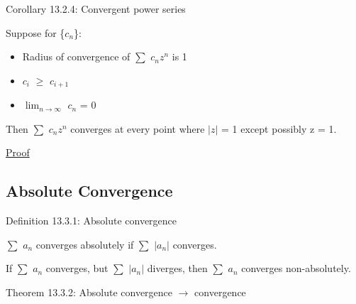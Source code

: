 { \color{orange} Corollary 13.2.4: Convergent power series }

    \begin{adjustbox}{minipage=14cm, right, vspace=0.1cm 0cm}
        Suppose for \{$c_n$\}:

        \begin{itemize}[leftmargin=1cm, itemsep=0.1cm]
            \item Radius of convergence of $\sum$ $c_n z^n$ is 1
            
            \item $c_i$ $\geq$ $c_{i+1}$
            
            \item $\lim_{n \rightarrow \infty}$ $c_n$ = 0
        \end{itemize}

        Then $\sum$ $c_n z^n$ converges at every point where $|z|$ = 1
        except possibly z = 1.
    \end{adjustbox}

{ \color{magenta} \underline{Proof} }






\subsection{ Absolute Convergence }

{ \color{blue} Definition 13.3.1: Absolute convergence }

    \begin{adjustbox}{minipage=14cm, right, vspace=0.1cm 0cm}
        $\sum$ $a_n$ converges absolutely if $\sum$ $|a_n|$ converges.

        If $\sum$ $a_n$ converges, but $\sum$ $|a_n|$ diverges,
        then $\sum$ $a_n$ converges non-absolutely.
    \end{adjustbox}

    \vspace{0.5cm}

{ \color{red} Theorem 13.3.2: Absolute convergence $\rightarrow$ convergence }

